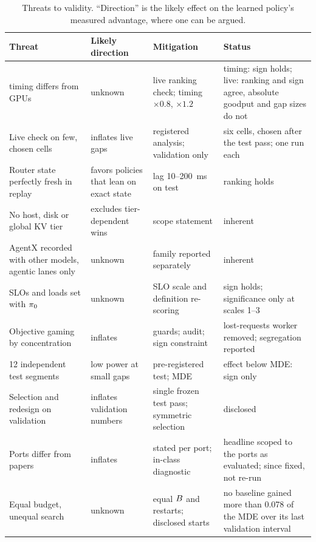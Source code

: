 \begin{table}[tbp]
  \centering\footnotesize
  \caption{Threats to validity. ``Direction'' is the likely effect on the learned policy's measured
    advantage, where one can be argued.}
  \label{tab:threats}
  \begin{tabularx}{\linewidth}{@{}YYYY@{}}
    \toprule
    Threat & Likely direction & Mitigation & Status \\
    \midrule
    \ais{} timing differs from GPUs & unknown & live ranking check; timing $\times 0.8$, $\times 1.2$ &
      timing: sign holds; live: ranking and sign agree, absolute goodput and gap sizes do not \\
    Live check on few, chosen cells & inflates live gaps & registered analysis; validation only &
      six cells, chosen after the test pass; one run each \\
    Router state perfectly fresh in replay & favors policies that lean on exact state & lag
      10--\SI{200}{ms} on test & ranking holds \\
    No host, disk or global KV tier & excludes tier-dependent wins & scope statement & inherent \\
    AgentX recorded with other models, agentic lanes only & unknown & family reported separately &
      inherent \\
    SLOs and loads set with $\pi_{0}$ & unknown & SLO scale and definition re-scoring & sign holds;
      significance only at scales 1--3 \\
    Objective gaming by concentration & inflates & guards; audit; sign constraint & lost-requests
      worker removed; segregation reported \\
    12 independent test segments & low power at small gaps & pre-registered test; MDE & effect below
      MDE: sign only \\
    Selection and redesign on validation & inflates validation numbers & single frozen test pass;
      symmetric selection & disclosed \\
    Ports differ from papers & inflates & stated per port; in-class diagnostic & headline scoped to
      the ports as evaluated;  since fixed, not re-run \\
    Equal budget, unequal search & unknown & equal $B$ and restarts; disclosed starts & no
      baseline gained more than 0.078 of the MDE over its last validation interval \\
    \bottomrule
  \end{tabularx}
\end{table}

